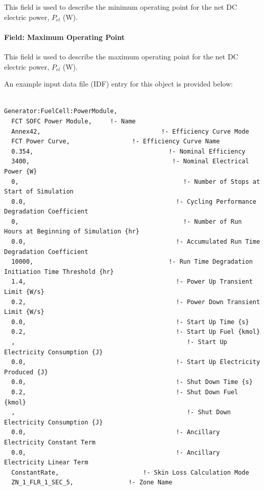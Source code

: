 This field is used to describe the minimum operating point for the net DC electric power, \({P_{el}}\) (W).

\paragraph{Field: Maximum Operating Point}\label{field-maximum-operating-point}

This field is used to describe the maximum operating point for the net DC electric power, \({P_{el}}\) (W).

An example input data file (IDF) entry for this object is provided below:

\begin{lstlisting}

Generator:FuelCell:PowerModule,
  FCT SOFC Power Module,     !- Name
  Annex42,                                 !- Efficiency Curve Mode
  FCT Power Curve,                 !- Efficiency Curve Name
  0.354,                                     !- Nominal Efficiency
  3400,                                       !- Nominal Electrical Power {W}
  0,                                             !- Number of Stops at Start of Simulation
  0.0,                                         !- Cycling Performance Degradation Coefficient
  0,                                             !- Number of Run Hours at Beginning of Simulation {hr}
  0.0,                                         !- Accumulated Run Time Degradation Coefficient
  10000,                                     !- Run Time Degradation Initiation Time Threshold {hr}
  1.4,                                         !- Power Up Transient Limit {W/s}
  0.2,                                         !- Power Down Transient Limit {W/s}
  0.0,                                         !- Start Up Time {s}
  0.2,                                         !- Start Up Fuel {kmol}
  ,                                               !- Start Up Electricity Consumption {J}
  0.0,                                         !- Start Up Electricity Produced {J}
  0.0,                                         !- Shut Down Time {s}
  0.2,                                         !- Shut Down Fuel {kmol}
  ,                                               !- Shut Down Electricity Consumption {J}
  0.0,                                         !- Ancillary Electricity Constant Term
  0.0,                                         !- Ancillary Electricity Linear Term
  ConstantRate,                       !- Skin Loss Calculation Mode
  ZN_1_FLR_1_SEC_5,               !- Zone Name

\end{lstlisting}
